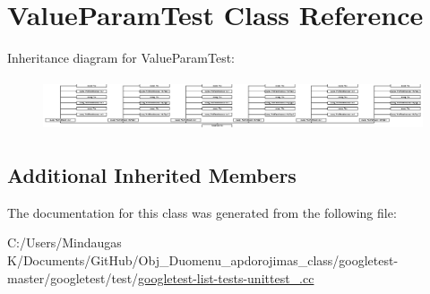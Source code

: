 \hypertarget{class_value_param_test}{}\section{Value\+Param\+Test Class Reference}
\label{class_value_param_test}
Inheritance diagram for Value\+Param\+Test\+:\begin{figure}[H]
\begin{center}
\leavevmode
\includegraphics[height=1.542700cm]{d8/d8b/class_value_param_test}
\end{center}
\end{figure}
\subsection*{Additional Inherited Members}


The documentation for this class was generated from the following file\+:\begin{DoxyCompactItemize}
\item 
C\+:/\+Users/\+Mindaugas K/\+Documents/\+Git\+Hub/\+Obj\+\_\+\+Duomenu\+\_\+apdorojimas\+\_\+class/googletest-\/master/googletest/test/\mbox{\hyperlink{googletest-master_2googletest_2test_2googletest-list-tests-unittest___8cc}{googletest-\/list-\/tests-\/unittest\+\_\+.\+cc}}\end{DoxyCompactItemize}
